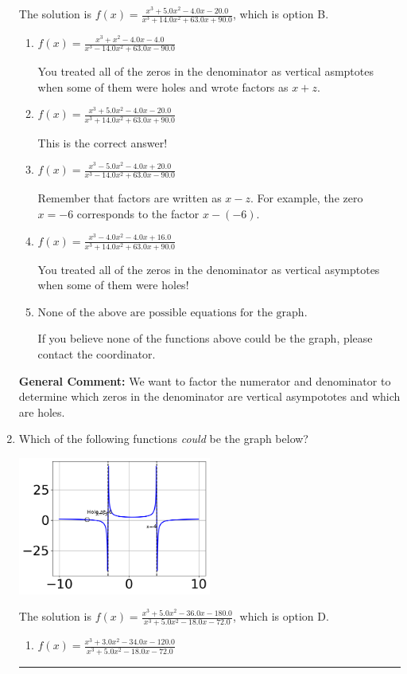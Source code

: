 \documentclass{extbook}[14pt]
\newcommand{\litem}[1]{\item #1

\rule{\textwidth}{0.4pt}}
\begin{document}
\begin{enumerate}
{The solution is \( f(x)=\frac{x^{3} +5.0 x^{2} -4.0 x -20.0}{x^{3} +14.0 x^{2} +63.0 x + 90.0} \), which is option B.\begin{enumerate}[label=\Alph*.]
\item \( f(x)=\frac{x^{3} + x^{2} -4.0 x -4.0}{x^{3} -14.0 x^{2} +63.0 x -90.0} \)

You treated all of the zeros in the denominator as vertical asmptotes when some of them were holes and wrote factors as $x+z$.
\item \( f(x)=\frac{x^{3} +5.0 x^{2} -4.0 x -20.0}{x^{3} +14.0 x^{2} +63.0 x + 90.0} \)

This is the correct answer!
\item \( f(x)=\frac{x^{3} -5.0 x^{2} -4.0 x + 20.0}{x^{3} -14.0 x^{2} +63.0 x -90.0} \)

Remember that factors are written as $x-z$. For example, the zero $x=-6$ corresponds to the factor $x-(-6)$.
\item \( f(x)=\frac{x^{3} -4.0 x^{2} -4.0 x + 16.0}{x^{3} +14.0 x^{2} +63.0 x + 90.0} \)

You treated all of the zeros in the denominator as vertical asymptotes when some of them were holes!
\item \( \text{None of the above are possible equations for the graph.} \)

If you believe none of the functions above could be the graph, please contact the coordinator.
\end{enumerate}

\textbf{General Comment:} We want to factor the numerator and denominator to determine which zeros in the denominator are vertical asympototes and which are holes.
}
\litem{
Which of the following functions \textit{could} be the graph below?

\begin{center}
    \includegraphics[width=0.5\textwidth]{../Figures/identifyGraphOfRationalFunctionB.png}
\end{center}


The solution is \( f(x)=\frac{x^{3} +5.0 x^{2} -36.0 x -180.0}{x^{3} +5.0 x^{2} -18.0 x -72.0} \), which is option D.\begin{enumerate}[label=\Alph*.]
\item \( f(x)=\frac{x^{3} +3.0 x^{2} -34.0 x -120.0}{x^{3} +5.0 x^{2} -18.0 x -72.0} \)


\end{enumerate}}
\end{enumerate}
\end{document}
